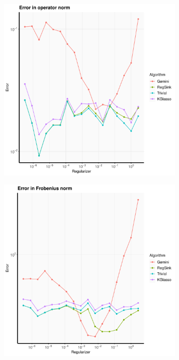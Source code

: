 \documentclass[aos]{imsart}
\theoremstyle{definition}
\numberwithin{equation}{section}
\begin{document}
\begin{figure}
\begin{subfigure}[b]{0.3\textwidth}
         \includegraphics[width=\textwidth]{./code/zhou-comparison/25-50-sparse-op.pdf}
     \end{subfigure}
     \hfill
     \begin{subfigure}[b]{0.3\textwidth}
         \centering
         \includegraphics[width=\textwidth]{./code/zhou-comparison/25-50-sparse-frob.pdf}

\end{subfigure}
\end{figure}
\end{document}
